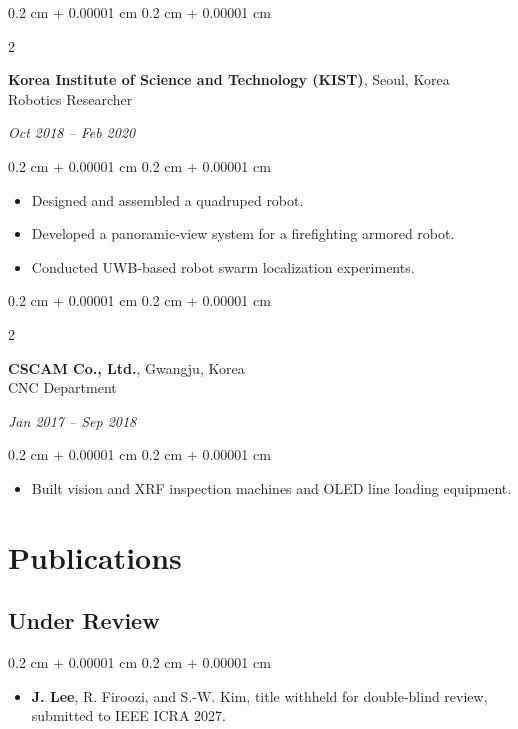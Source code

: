 \documentclass[10pt, letterpaper]{article}
\newenvironment{highlights}{
    \begin{itemize}[
        topsep=0.10 cm,
        parsep=0.10 cm,
        partopsep=0pt,
        itemsep=0pt,
        leftmargin=0.4 cm + 10pt
    ]
}{
    \end{itemize}
} %
\newenvironment{onecolentry}{
    \begin{adjustwidth}{
        0.2 cm + 0.00001 cm
    }{
        0.2 cm + 0.00001 cm
    }
}{
    \end{adjustwidth}
} %
\newenvironment{twocolentry}[2][]{
    \onecolentry
    \def\secondColumn{#2}
    \setcolumnwidth{\fill, 4.5 cm}
    \begin{paracol}{2}
}{
    \switchcolumn \raggedleft \secondColumn
    \end{paracol}
    \endonecolentry
} %
\begin{document}
\vspace{0.2 cm}

\begin{twocolentry}{\textit{Oct 2018 -- Feb 2020}}
\textbf{Korea Institute of Science and Technology (KIST)}, Seoul, Korea\\
Robotics Researcher
\end{twocolentry}
\begin{onecolentry}
\begin{highlights}
    \item Designed and assembled a quadruped robot.
    \item Developed a panoramic-view system for a firefighting armored robot.
    \item Conducted UWB-based robot swarm localization experiments.
\end{highlights}
\end{onecolentry}

\vspace{0.2 cm}

\begin{twocolentry}{\textit{Jan 2017 -- Sep 2018}}
\textbf{CSCAM Co., Ltd.}, Gwangju, Korea\\
CNC Department
\end{twocolentry}
\begin{onecolentry}
\begin{highlights}
    \item Built vision and XRF inspection machines and OLED line loading equipment.
\end{highlights}
\end{onecolentry}

\newpage
\section{Publications}
\subsection*{Under Review}
\begin{onecolentry}
\begin{highlights}
    \item \textbf{J. Lee}, R. Firoozi, and S.-W. Kim, title withheld for double-blind review, submitted to IEEE ICRA 2027.
\end{highlights}
\end{onecolentry}
\end{document}
